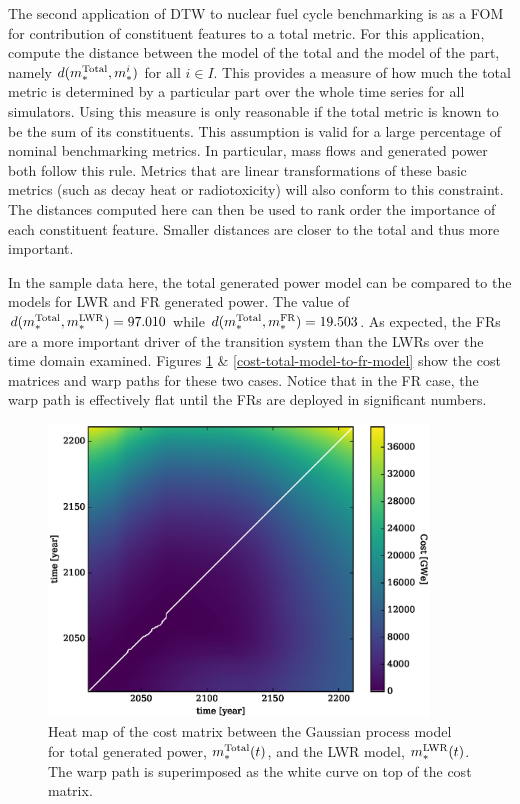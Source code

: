 The second application of DTW to nuclear fuel cycle benchmarking is as a
FOM for contribution of constituent features to a total metric. For this application, 
compute the distance between the model of the total and the model of the 
part, namely $d(m_*^{\mathrm{Total}}, m_*^i)$ for all $i \in I$. This provides a 
measure of how much the total metric is determined by a particular part
over the whole time series for all simulators.
Using this measure is only reasonable if the total metric is known 
to be the sum of its constituents.  This assumption is valid for 
a large percentage of nominal benchmarking metrics. In particular, 
mass flows and generated power both follow this rule. Metrics that are 
linear transformations of these basic metrics (such as decay heat or 
radiotoxicity) will also conform to this constraint. The distances computed here
can then be used to rank order the importance of each constituent feature. 
Smaller distances are closer to the total and thus more important.

In the sample data here, the total generated power model can be compared to 
the models for LWR and FR generated power. The value of 
$d(m_*^{\mathrm{Total}}, m_*^{\mathrm{LWR}}) = 97.010$ while $d(m_*^{\mathrm{Total}}, m_*^{\mathrm{FR}}) = 19.503$.
As expected, the FRs are a more important driver of the transition system 
than the LWRs over the time domain examined. Figures 
\ref{cost-total-model-to-lwr-model} \& \ref{cost-total-model-to-fr-model}
show the cost matrices and warp paths for these two cases.  Notice that in the
FR case, the warp path is effectively flat until the FRs are deployed in 
significant numbers. 
 
\begin{figure}[htb]
\centering
\includegraphics[width=0.9\textwidth]{cost-total-model-to-lwr-model.eps}
\caption{Heat map of the cost matrix between the Gaussian process model 
for total generated power, $m_*^{\mathrm{Total}}(t)$, and the LWR model, 
$m_*^{\mathrm{LWR}}(t)$.
The warp path is superimposed as the white curve on top of the cost matrix.}
\label{cost-total-model-to-lwr-model}
\end{figure}

